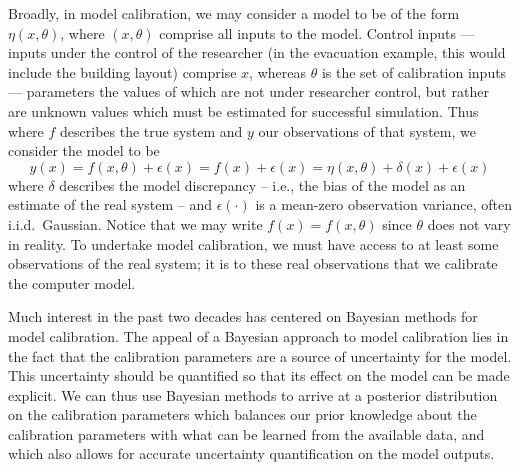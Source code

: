 \documentclass{article}
\begin{document}
Broadly, in model calibration, we may consider a model to be of the form $\eta(x,\theta)$, where $(x,\theta)$ comprise all inputs to the model. Control inputs --- inputs under the control of the researcher (in the evacuation example, this would include the building layout) comprise $x$, whereas $\theta$ is the set of calibration inputs --- parameters the values of which are not under researcher control, but rather are unknown values which must be estimated for successful simulation. Thus where $f$ describes the true system and $y$ our observations of that system, we consider the model to be 
\begin{equation} \label{eq:model_gen}
y(x)=f(x,\theta)+\epsilon(x)=f(x)+\epsilon(x)=\eta(x,\theta) + \delta(x)+\epsilon(x)
\end{equation} 
where $\delta$ describes the model discrepancy -- i.e., the bias of the model as an estimate of the real system -- and $\epsilon(\cdot)$ is a mean-zero observation variance, often i.i.d.\ Gaussian. Notice that we may write $f(x)=f(x,\theta)$ since $\theta$ does not vary in reality. To undertake model calibration, we must have access to at least some observations of the real system; it is to these real observations that we calibrate the computer model.

Much interest in the past two decades has centered on Bayesian methods for model calibration. The appeal of a Bayesian approach to model calibration lies in the fact that the calibration parameters are a source of uncertainty for the model. This uncertainty should be quantified so that its effect on the model can be made explicit. We can thus use Bayesian methods to arrive at a posterior distribution on the calibration parameters which balances our prior knowledge about the calibration parameters with what can be learned from the available data, and which also allows for accurate uncertainty quantification on the model outputs. 
\end{document}

